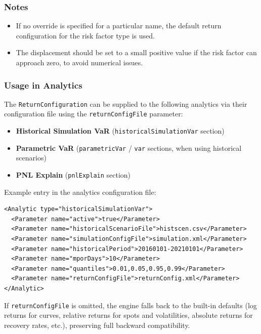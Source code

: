 \subsubsection*{Notes}

\begin{itemize}
    \item If no override is specified for a particular name, the default return configuration for the risk factor type is used.
    \item The displacement should be set to a small positive value if the risk factor can approach zero, to avoid numerical issues.
\end{itemize}

\subsubsection*{Usage in Analytics}

The \lstinline|ReturnConfiguration| can be supplied to the following analytics via their configuration file using
the \lstinline|returnConfigFile| parameter:

\begin{itemize}
    \item \textbf{Historical Simulation VaR} (\lstinline|historicalSimulationVar| section)
    \item \textbf{Parametric VaR} (\lstinline|parametricVar| / \lstinline|var| sections, when using historical scenarios)
    \item \textbf{PNL Explain} (\lstinline|pnlExplain| section)
\end{itemize}

Example entry in the analytics configuration file:

\begin{listing}
\begin{verbatim}
<Analytic type="historicalSimulationVar">
  <Parameter name="active">true</Parameter>
  <Parameter name="historicalScenarioFile">histscen.csv</Parameter>
  <Parameter name="simulationConfigFile">simulation.xml</Parameter>
  <Parameter name="historicalPeriod">20160101-20210101</Parameter>
  <Parameter name="mporDays">10</Parameter>
  <Parameter name="quantiles">0.01,0.05,0.95,0.99</Parameter>
  <Parameter name="returnConfigFile">returnConfig.xml</Parameter>
</Analytic>
\end{verbatim}
\caption{Using a custom return configuration in Historical Simulation VaR}
\label{lst:histsimvar_returnconfig}
\end{listing}

If \lstinline|returnConfigFile| is omitted, the engine falls back to the built-in defaults
(log returns for curves, relative returns for spots and volatilities, absolute returns for recovery rates, etc.),
preserving full backward compatibility.